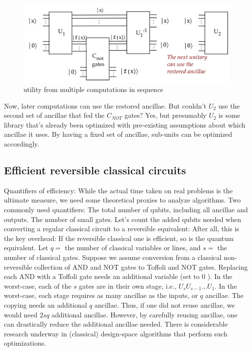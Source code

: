 \documentclass[main.tex]{subfiles}
\begin{document}
    \begin{figure}
        \centering
        \includegraphics[width=5in]{notes/figs/n10/42uncompute3.png}
        \caption{utility from multiple computations in sequence}
        \label{fig:42uncompute3}
    \end{figure}
    
    Now, later computations can use the restored ancillae. But couldn't $U_{2}$ use the second set of ancillae that fed the $C_{N O T}$ gates? Yes, but presumably $U_{2}$ is some library that's already been optimized with pre-existing assumptions about which ancillae it uses. By having a fixed set of ancillae, sub-units can be optimized accordingly.

\subsection{Efficient reversible classical circuits}

    Quantifiers of efficiency: While the actual time taken on real problems is the ultimate measure, we need some theoretical proxies to analyze algorithms. Two commonly used quantifiers: The total number of qubits, including all ancillae and outputs. The number of small gates. Let's count the added qubits needed when converting a regular classical circuit to a reversible equivalent: After all, this is the key overhead: If the reversible classical one is efficient, so is the quantum equivalent. Let $q=$ the number of classical variables or lines, and $s=$ the number of classical gates. Suppose we assume conversion from a classical non-reversible collection of AND and NOT gates to Toffoli and NOT gates. Replacing each AND with a Toffoli gate needs an additional variable (set to 0 ). In the worst-case, each of the $s$ gates are in their own stage, i.e., $U_{s} U_{s-1} \ldots U_{1}$. In the worst-case, each stage requires as many ancillae as the inputs, or $q$ ancillae. The copying needs an additional $q$ ancillae. Thus, if one did not reuse ancillae, we would need $2 s q$ additional ancillae. However, by carefully reusing ancillae, one can drastically reduce the additional ancillae needed. There is considerable research underway in (classical) design-space algorithms that perform such optimizations.
\end{document}
